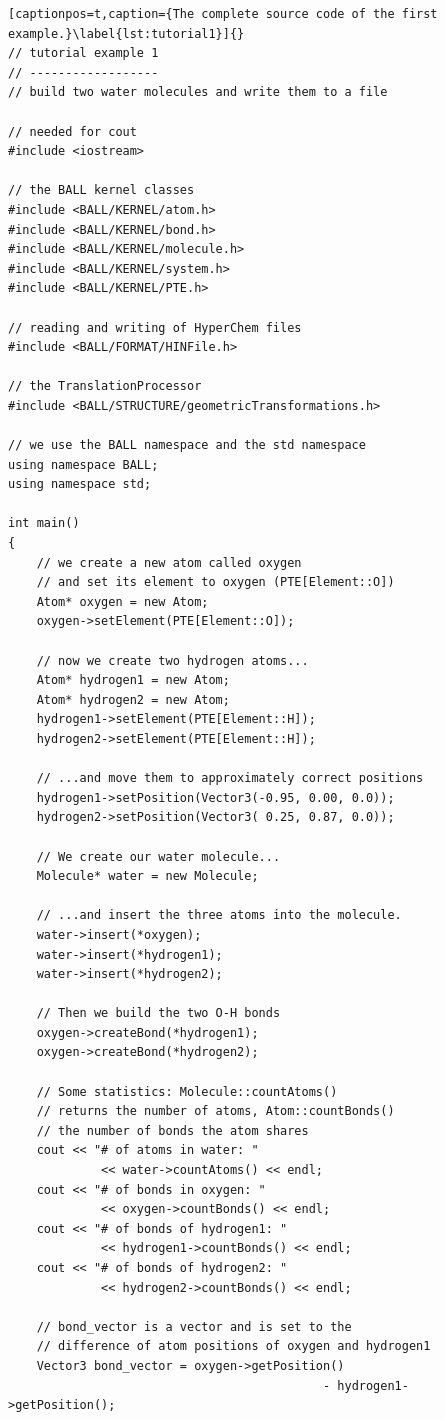\newpage
\begin{lstlisting}[captionpos=t,caption={The complete source code of the first example.}\label{lst:tutorial1}]{}
// tutorial example 1
// ------------------
// build two water molecules and write them to a file

// needed for cout
#include <iostream>

// the BALL kernel classes
#include <BALL/KERNEL/atom.h>
#include <BALL/KERNEL/bond.h>
#include <BALL/KERNEL/molecule.h>
#include <BALL/KERNEL/system.h>
#include <BALL/KERNEL/PTE.h>

// reading and writing of HyperChem files
#include <BALL/FORMAT/HINFile.h>

// the TranslationProcessor
#include <BALL/STRUCTURE/geometricTransformations.h>

// we use the BALL namespace and the std namespace
using namespace BALL;
using namespace std;

int main()
{
	// we create a new atom called oxygen
	// and set its element to oxygen (PTE[Element::O])
	Atom* oxygen = new Atom;
	oxygen->setElement(PTE[Element::O]);

	// now we create two hydrogen atoms...
	Atom* hydrogen1 = new Atom;
	Atom* hydrogen2 = new Atom;
	hydrogen1->setElement(PTE[Element::H]);
	hydrogen2->setElement(PTE[Element::H]);

	// ...and move them to approximately correct positions
 	hydrogen1->setPosition(Vector3(-0.95, 0.00, 0.0));
 	hydrogen2->setPosition(Vector3( 0.25, 0.87, 0.0));

	// We create our water molecule...
	Molecule* water = new Molecule;

	// ...and insert the three atoms into the molecule.
	water->insert(*oxygen);
	water->insert(*hydrogen1);
	water->insert(*hydrogen2);

	// Then we build the two O-H bonds
	oxygen->createBond(*hydrogen1);
	oxygen->createBond(*hydrogen2);

	// Some statistics: Molecule::countAtoms() 
	// returns the number of atoms, Atom::countBonds() 
	// the number of bonds the atom shares
	cout << "# of atoms in water: " 
			 << water->countAtoms() << endl;
	cout << "# of bonds in oxygen: " 
			 << oxygen->countBonds() << endl;
	cout << "# of bonds of hydrogen1: " 
			 << hydrogen1->countBonds() << endl;
	cout << "# of bonds of hydrogen2: " 
			 << hydrogen2->countBonds() << endl;

	// bond_vector is a vector and is set to the
	// difference of atom positions of oxygen and hydrogen1
	Vector3 bond_vector = oxygen->getPosition() 
											- hydrogen1->getPosition();


\end{lstlisting}
